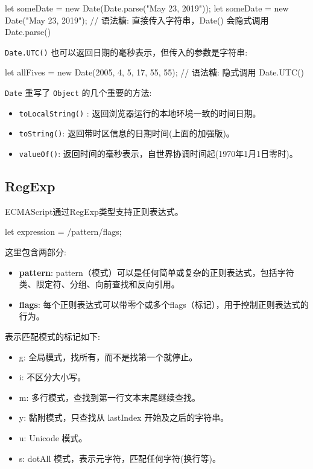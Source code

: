 \begin{JavaScript}
let someDate = new Date(Date.parse("May 23, 2019"));
let someDate = new Date("May 23, 2019");    // 语法糖: 直接传入字符串，Date() 会隐式调用 Date.parse()
\end{JavaScript}

\texttt{Date.UTC()} 也可以返回日期的毫秒表示，但传入的参数是字符串:

\begin{JavaScript}
let allFives = new Date(2005, 4, 5, 17, 55, 55);  // 语法糖: 隐式调用  Date.UTC()
\end{JavaScript}

\texttt{Date} 重写了 \texttt{Object} 的几个重要的方法:
\begin{itemize}
    \item \texttt{toLocalString()} : 返回浏览器运行的本地环境一致的时间日期。
    \item \texttt{toString()}: 返回带时区信息的日期时间(上面的加强版)。
    \item \texttt{valueOf()}: 返回时间的毫秒表示，自世界协调时间起(1970年1月1日零时)。
\end{itemize}

\subsection{RegExp}

ECMAScript通过RegExp类型支持正则表达式。

\begin{JavaScript}
let expression = /pattern/flags;
\end{JavaScript}

这里包含两部分:
\begin{itemize}
    \item \textbf{pattern}: pattern（模式）可以是任何简单或复杂的正则表达式，包括字符类、限定符、分组、向前查找和反向引用。
    \item \textbf{flags}: 每个正则表达式可以带零个或多个flags（标记），用于控制正则表达式的行为。
\end{itemize}

表示匹配模式的标记如下:
\begin{itemize}
    \item g: 全局模式，找所有，而不是找第一个就停止。
    \item i: 不区分大小写。
    \item m: 多行模式，查找到第一行文本末尾继续查找。
    \item y: 黏附模式，只查找从 lastIndex 开始及之后的字符串。
    \item u: Unicode 模式。
    \item s: dotAll 模式，表示元字符，匹配任何字符(换行等)。
\end{itemize}

